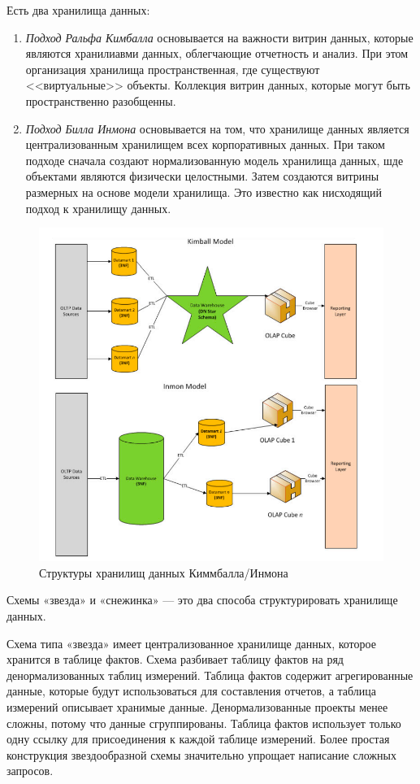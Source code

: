 Есть два хранилища данных:
\begin{enumerate}
	\item \textit{Подход Ральфа Кимбалла} основывается на важности витрин данных, которые являются хранилиавми данных, облегчающие отчетность и анализ. При этом организация хранилища пространственная, где существуют <<виртуальные>> объекты. Коллекция витрин данных, которые могут быть пространственно разобщенны.
	\item \textit{Подход Билла Инмона} основывается на том, что хранилище данных является централизованным хранилищем всех корпоративных данных. При таком подходе сначала создают нормализованную модель хранилища данных, шде объектами являются физически целостными. Затем создаются витрины размерных на основе модели хранилища. Это известно как нисходящий подход к хранилищу данных.
\end{enumerate}

\begin{figure}[h]
	\centering
	\includegraphics[width=18cm, keepaspectratio]{assets/db-places.png}
	\caption{Структуры хранилищ данных Киммбалла/Инмона} 
\end{figure}

Схемы «звезда» и «снежинка» — это два способа структурировать хранилище данных.

Схема типа «звезда» имеет централизованное хранилище данных, которое хранится в таблице фактов. Схема разбивает таблицу фактов на ряд денормализованных таблиц измерений. Таблица фактов содержит агрегированные данные, которые будут использоваться для составления отчетов, а таблица измерений описывает хранимые данные. Денормализованные проекты менее сложны, потому что данные сгруппированы. Таблица фактов использует только одну ссылку для присоединения к каждой таблице измерений. Более простая конструкция звездообразной схемы значительно упрощает написание сложных запросов.

